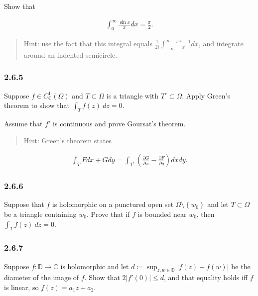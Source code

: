 Show that

\begin{align*}
\int_{0}^{\infty} \frac{\sin x}{x} d x=\frac{\pi}{2}
.\end{align*}

\begin{quote}
Hint: use the fact that this integral equals
\(\frac{1}{2 i} \int_{-\infty}^{\infty} \frac{e^{i x}-1}{x} d x\), and
integrate around an indented semicircle.
\end{quote}

\hypertarget{section-39}{%
\subsubsection{2.6.5}\label{section-39}}

Suppose \(f\in C_{\mathbb{C}}^1(\Omega)\) and \(T\subset \Omega\) is a
triangle with \(T^\circ \subset \Omega\). Apply Green's theorem to show
that \(\int_T f(z) ~dz = 0\).

Assume that \(f'\) is continuous and prove Goursat's theorem.

\begin{quote}
Hint: Green's theorem states
\end{quote}

\begin{align*}
\int_{T} F d x+G d y=\int_{T^\circ}\left(\frac{\partial G}{\partial x}-\frac{\partial F}{\partial y}\right) d x d y
.\end{align*}

\hypertarget{section-40}{%
\subsubsection{2.6.6}\label{section-40}}

Suppose that \(f\) is holomorphic on a punctured open set
\(\Omega\setminus\left\{{w_0}\right\}\) and let \(T\subset \Omega\) be a
triangle containing \(w_0\). Prove that if \(f\) is bounded near
\(w_0\), then \(\int_T f(z) ~dz = 0\).

\hypertarget{section-41}{%
\subsubsection{2.6.7}\label{section-41}}

Suppose \(f: {\mathbb{D}}\to {\mathbb{C}}\) is holomorphic and let
\(d \coloneqq\sup_{z, w\in {\mathbb{D}}}{\left\lvert {f(z) - f(w)} \right\rvert}\)
be the diameter of the image of \(f\). Show that
\(2 {\left\lvert {f'(0)} \right\rvert} \leq d\), and that equality holds
iff \(f\) is linear, so \(f(z) = a_1 z + a_2\).

